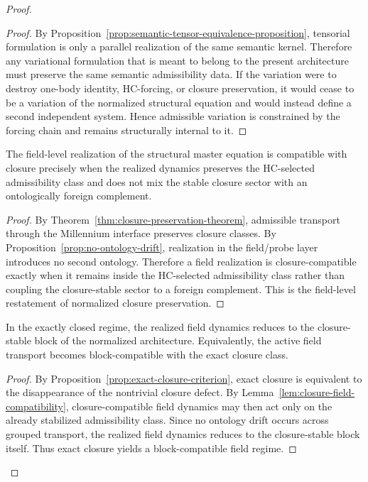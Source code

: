 \begin{proof}
\begin{proof}
By Proposition~\ref{prop:semantic-tensor-equivalence-proposition}, tensorial formulation is
only a parallel realization of the same semantic kernel. Therefore any
variational formulation that is meant to belong to the present architecture must
preserve the same semantic admissibility data. If the variation were to destroy
one-body identity, HC-forcing, or closure preservation, it would cease to be a
variation of the normalized structural equation and would instead define a
second independent system. Hence admissible variation is constrained by the
forcing chain and remains structurally internal to it.
\end{proof}

\begin{lemma}
\label{lem:closure-field-compatibility}
The field-level realization of the structural master equation is compatible with
closure precisely when the realized dynamics preserves the HC-selected
admissibility class and does not mix the stable closure sector with an
ontologically foreign complement.
\end{lemma}

\begin{proof}
By Theorem~\ref{thm:closure-preservation-theorem}, admissible transport through
the Millennium interface preserves closure classes. By Proposition~\ref{prop:no-ontology-drift},
realization in the field/probe layer introduces no second ontology. Therefore a
field realization is closure-compatible exactly when it remains inside the
HC-selected admissibility class rather than coupling the closure-stable sector
to a foreign complement. This is the field-level restatement of normalized
closure preservation.
\end{proof}

\begin{theorem}
\label{thm:exact-closure-field-theorem}
In the exactly closed regime, the realized field dynamics reduces to the
closure-stable block of the normalized architecture. Equivalently, the active
field transport becomes block-compatible with the exact closure class.
\end{theorem}

\begin{proof}
By Proposition~\ref{prop:exact-closure-criterion}, exact closure is equivalent
to the disappearance of the nontrivial closure defect. By
Lemma~\ref{lem:closure-field-compatibility}, closure-compatible field dynamics
may then act only on the already stabilized admissibility class. Since no
ontology drift occurs across grouped transport, the realized field dynamics
reduces to the closure-stable block itself. Thus exact closure yields a
block-compatible field regime.
\end{proof}


\end{proof}
